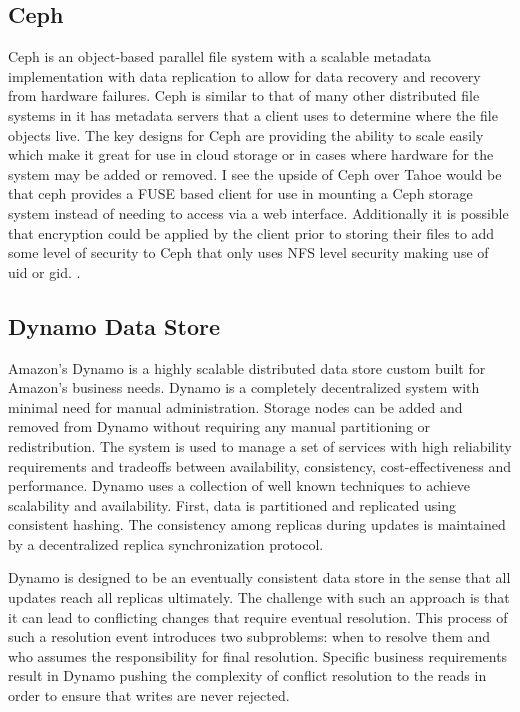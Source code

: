 \documentclass[11pt]{article}
\begin{document}
\subsection{Ceph}
Ceph is an object-based parallel file system with a scalable metadata implementation with data replication to allow for data recovery and recovery from hardware failures. Ceph is similar to that of many other distributed file systems in it has metadata servers that a client uses to determine where the file objects live. The key designs for Ceph are providing the ability to scale easily which make it great for use in cloud storage or in cases where hardware for the system may be added or removed. I see the upside of Ceph over Tahoe would be that ceph provides a FUSE based client for use in mounting a Ceph storage system instead of needing to access via a web interface. Additionally it is possible that encryption could be applied by the client prior to storing their files to add some level of security to Ceph that only uses NFS level security making use of uid or gid. 
\cite{Weil:2012p1035,Weil:2012p1010,Weil:2006p1273}.

\subsection{Dynamo Data Store}
Amazon's Dynamo is a highly scalable distributed data store custom built 
for Amazon’s business needs. Dynamo is a completely decentralized system 
with minimal need for manual administration. Storage nodes can be added 
and removed from Dynamo without requiring any manual partitioning or 
redistribution. The system is used to manage a set of services with high 
reliability requirements and tradeoffs between availability, consistency, 
cost-effectiveness and performance. Dynamo uses a collection of well known 
techniques to achieve scalability and availability. First, data is 
partitioned and replicated using consistent hashing. The consistency among 
replicas during updates is maintained by a decentralized replica 
synchronization protocol. 

Dynamo is designed to be an eventually consistent data store in the sense 
that all updates reach all replicas ultimately. The challenge with such 
an approach is that it can lead to conflicting changes that require 
eventual resolution. This process of such a resolution event introduces 
two subproblems: when to resolve them and who assumes the responsibility 
for final resolution. Specific business requirements result in Dynamo 
pushing the complexity of conflict resolution to the reads in order to 
ensure that writes are never rejected.
\end{document}
